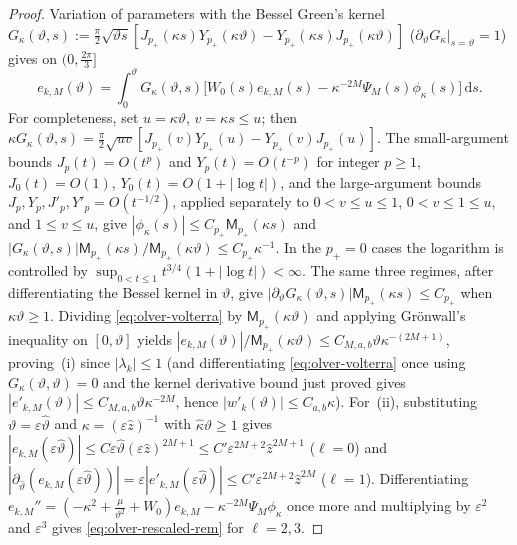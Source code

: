 \documentclass[11pt]{article}
\theoremstyle{definition}
\theoremstyle{remark}
\newcommand{\dd}{\mathrm{d}}
\renewcommand{\_}{\oldunderscore\penalty0\hskip0pt\relax}
\begin{document}
\begin{proof}
Variation of parameters with the Bessel Green's kernel $G_\kappa(\vartheta,s):=\frac{\pi}{2}\sqrt{\vartheta s}[J_{p_+}(\kappa
  s)Y_{p_+}(\kappa\vartheta)-Y_{p_+}(\kappa s)J_{p_+}(\kappa\vartheta)]$ ($\partial_\vartheta G_\kappa|_{s=\vartheta}=1$) gives
  on $(0,\frac{2\pi}{3}]$
\begin{equation}
  e_{k,M}(\vartheta) = \int_0^\vartheta G_\kappa(\vartheta,s)\bigl[W_0(s)e_{k,M}(s) - \kappa^{-2M}\Psi_M(s)\phi_\kappa(s)\bigr]\,\dd s.
  \label{eq:olver-volterra}
\end{equation}
For completeness, set $u=\kappa\vartheta$, $v=\kappa s\le u$; then $\kappa
  G_\kappa(\vartheta,s)=\frac{\pi}{2}\sqrt{uv}[J_{p_+}(v)Y_{p_+}(u)-Y_{p_+}(v)J_{p_+}(u)]$. The small-argument bounds
  $J_p(t)=O(t^p)$ and $Y_p(t)=O(t^{-p})$ for integer $p\ge1$, $J_0(t)=O(1)$, $Y_0(t)=O(1+|\log t|)$, and the large-argument
  bounds $J_p,Y_p,J'_p,Y'_p=O(t^{-1/2})$, applied separately to $0<v\le u\le1$, $0<v\le1\le u$, and $1\le v\le u$, give
  $|\phi_\kappa(s)|\le C_{p_+}\mathsf{M}_{p_+}(\kappa s)$ and $|G_\kappa(\vartheta,s)|\mathsf{M}_{p_+}(\kappa
  s)/\mathsf{M}_{p_+}(\kappa\vartheta)\le C_{p_+}\kappa^{-1}$. In the $p_+=0$ cases the logarithm is controlled by
  $\sup_{0<t\le1}t^{3/4}(1+|\log t|)<\infty$. The same three regimes, after differentiating the Bessel kernel in $\vartheta$,
  give $|\partial_\vartheta G_\kappa(\vartheta,s)|\mathsf{M}_{p_+}(\kappa s)\le C_{p_+}$ when $\kappa\vartheta\ge1$. Dividing
  \eqref{eq:olver-volterra} by $\mathsf{M}_{p_+}(\kappa\vartheta)$ and applying Gr\"onwall's inequality on $[0,\vartheta]$ yields
  $|e_{k,M}(\vartheta)|/\mathsf{M}_{p_+}(\kappa\vartheta)\le C_{M,a,b}\vartheta\kappa^{-(2M+1)}$, proving~(i) since
  $|\lambda_k|\le 1$ (and differentiating \eqref{eq:olver-volterra} once using $G_\kappa(\vartheta,\vartheta)=0$ and the kernel
  derivative bound just proved gives $|e'_{k,M}(\vartheta)|\le C_{M,a,b}\vartheta\kappa^{-2M}$, hence $|w'_k(\vartheta)|\le
  C_{a,b}\kappa$). For~(ii), substituting $\vartheta=\varepsilon\hat{\vartheta}$ and $\kappa=(\varepsilon\hat{z})^{-1}$ with
  $\hat{\kappa}\hat{\vartheta}\ge 1$ gives $|e_{k,M}(\varepsilon\hat{\vartheta})|\le
  C\varepsilon\hat{\vartheta}(\varepsilon\hat{z})^{2M+1}\le C'\varepsilon^{2M+2}\hat{z}^{2M+1}$ ($\ell=0$) and
  $|\partial_{\hat{\vartheta}}(e_{k,M}(\varepsilon\hat{\vartheta}))|=\varepsilon|e'_{k,M}(\varepsilon\hat{\vartheta})|\le
  C'\varepsilon^{2M+2}\hat{z}^{2M}$ ($\ell=1$). Differentiating
  $e_{k,M}''=(-\kappa^2+\frac{\mu}{\vartheta^2}+W_0)e_{k,M}-\kappa^{-2M}\Psi_M\phi_\kappa$ once more and multiplying by
  $\varepsilon^2$ and $\varepsilon^3$ gives \eqref{eq:olver-rescaled-rem} for $\ell=2,3$.
\end{proof}
\end{document}
